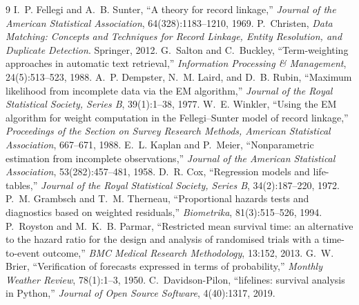 \documentclass[11pt]{article}
\begin{document}
\begin{thebibliography}{9}
 I.~P. Fellegi and A.~B. Sunter,
``A theory for record linkage,''
\emph{Journal of the American Statistical Association}, 64(328):1183--1210, 1969.
 P.~Christen,
\emph{Data Matching: Concepts and Techniques for Record Linkage, Entity
Resolution, and Duplicate Detection}. Springer, 2012.
 G.~Salton and C.~Buckley,
``Term-weighting approaches in automatic text retrieval,''
\emph{Information Processing \& Management}, 24(5):513--523, 1988.
 A.~P. Dempster, N.~M. Laird, and D.~B. Rubin,
``Maximum likelihood from incomplete data via the EM algorithm,''
\emph{Journal of the Royal Statistical Society, Series B}, 39(1):1--38, 1977.
 W.~E. Winkler,
``Using the EM algorithm for weight computation in the Fellegi--Sunter
model of record linkage,'' \emph{Proceedings of the Section on Survey
Research Methods, American Statistical Association}, 667--671, 1988.
 E.~L. Kaplan and P.~Meier,
``Nonparametric estimation from incomplete observations,''
\emph{Journal of the American Statistical Association}, 53(282):457--481, 1958.
 D.~R. Cox,
``Regression models and life-tables,''
\emph{Journal of the Royal Statistical Society, Series B}, 34(2):187--220, 1972.
 P.~M. Grambsch and T.~M. Therneau,
``Proportional hazards tests and diagnostics based on weighted residuals,''
\emph{Biometrika}, 81(3):515--526, 1994.
 P.~Royston and M.~K.~B. Parmar,
``Restricted mean survival time: an alternative to the hazard ratio for the
design and analysis of randomised trials with a time-to-event outcome,''
\emph{BMC Medical Research Methodology}, 13:152, 2013.
 G.~W. Brier,
``Verification of forecasts expressed in terms of probability,''
\emph{Monthly Weather Review}, 78(1):1--3, 1950.
 C.~Davidson-Pilon,
``lifelines: survival analysis in Python,''
\emph{Journal of Open Source Software}, 4(40):1317, 2019.
\end{thebibliography}
\end{document}
